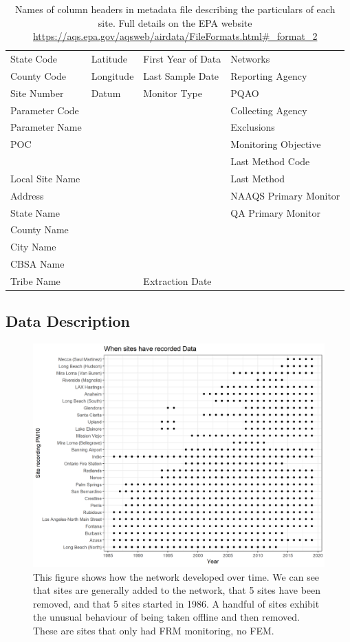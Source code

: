 \begin{table}[ht]
\centering
\begin{tabular}{l|l|l|l}
	\hline
	State Code & Latitude & First Year of Data &  Networks\\
	County Code & Longitude & Last Sample Date &  Reporting Agency\\
	Site Number & Datum & Monitor Type & PQAO\\
	Parameter Code & & & Collecting Agency\\
	Parameter Name & & & Exclusions\\
	POC & & & Monitoring Objective\\
	& & & Last Method Code \\
	Local Site Name & & & Last Method \\
	Address & & & NAAQS Primary Monitor \\
	State Name & & & QA Primary Monitor \\
	County Name & & & \\
	City Name & & & \\
	CBSA Name & & & \\
	Tribe Name & & Extraction Date & \\
\end{tabular}
\caption{Names of column headers in metadata file describing the particulars of each site.  Full details on the \ac{EPA} website \url{https://aqs.epa.gov/aqsweb/airdata/FileFormats.html\#_format_2}}
\label{table:metadata_column_headers}
\end{table}

\subsection{Data Description}
\label{subsec:datadescripion}
\begin{figure}[ht]
\centering
\includegraphics[width = \textwidth]{Figures/site_dotplot-colour.png}
\caption{This figure shows how the network developed over time.  We can see that sites are generally added to the network, that 5 sites have been removed, and that 5 sites started in 1986.  A handful of sites exhibit the unusual behaviour of being taken offline and then removed.  These are sites that only had \ac{FRM} monitoring, no \ac{FEM}.}
\label{fig:site_dotplot}
\end{figure}

